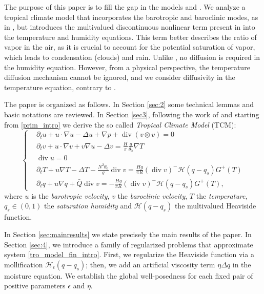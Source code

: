 \documentclass[11pt, a4paper, article,reqno,]{amsart}
\theoremstyle{remark}
\DeclareMathOperator{\dive}{div}
\numberwithin{equation}{section}
\begin{document}
The purpose of this paper is to fill the gap in the models \cite{LT} and \cite{CZ}. We analyze a tropical climate model that incorporates the barotropic and baroclinic modes, as in \cite{LT}, but introduces the multivalued discontinuous nonlinear term present in \cite{CZ} into the temperature and humidity equations. This term better describes the ratio of vapor in the air, as it is crucial to account for the potential saturation of vapor, which leads to condensation (clouds) and rain. Unlike \cite{CZ}, no diffusion is required in the humidity equation. However, from a physical perspective, the temperature diffusion mechanism cannot be ignored, and we consider diffusivity in the temperature equation, contrary to \cite{LT}.
 

 
 The paper is organized as follows. In Section \ref{sec:2} some technical lemmas and basic notations are reviewed. In Section \ref{sec3}, following the work of \cite{FM} and starting from \eqref{prim_intro} we derive the so called \textit{Tropical Climate Model} (TCM): 
\begin{equation}\label{tro_model_fin_intro}
     \left\{\begin{aligned}
&\partial_t u + u \cdot \nabla u - \Delta u + \nabla p + \dive (v \otimes v) = 0\\
& \partial_ t v + u \cdot \nabla v + v \nabla u - \Delta v = \frac{H}{\pi} \frac{g}{\theta_0} \nabla T \\
& \dive u = 0 \\
& \partial_t T + u \nabla T - \Delta T - \frac{N^2 \theta_0}{g} \dive v =  \frac{H g}{\pi R}(\dive v)^- \mathcal{H}(q-q_s) G^+(T)\\
& \partial_t q + u \nabla q + \bar{Q} \dive v = -  \frac{H g}{\pi R}(\dive v)^- \mathcal{H}(q-q_s) G^+(T),
    \end{aligned}\right.
\end{equation}
where $u$ is the \textit{barotropic velocity}, $v$ the \textit{baroclinic velocity}, $T$ the \textit{temperature}, $q_s \in (0,1)$ the \textit{saturation humidity} and $\mathcal{H}(q-q_s)$ the multivalued Heaviside function.

In Section \ref{sec:mainresults} we state precisely the main results of the paper. In Section \ref{sec:4}, we introduce a family of regularized problems that approximate system \eqref{tro_model_fin_intro}. First, we regularize the Heaviside function via a mollification $\mathcal{H}_\epsilon(q-q_s)$; then, we add an artificial viscosity term $\eta \Delta q$ in the moisture equation. We establish the global well-posedness for each fixed pair of positive parameters $\epsilon$ and $\eta$.
\end{document}
